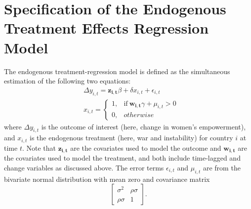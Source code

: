 \section{Specification of the Endogenous Treatment Effects Regression Model}
\vspace*{.2in}
\setlength{\parskip}{-2em}
\doublespacing
\setcounter{table}{0}
\setcounter{figure}{0}


The endogenous treatment-regression model is defined as the simultaneous estimation of the following two equations:
\begin{align}
& \Delta y_{i,t} = \mathbf{z_{i,t}} \beta + \delta x_{i,t} + \epsilon_{i,t} \\
& x_{i,t} = 
 \begin{cases}
 1, & \text{if}\ \mathbf{w_{i,t}} \gamma + \mu_{i,t} >0\\ %
 0, & otherwise
 \end{cases}
\end{align}
where $\Delta y_{i,t}$ is the outcome of interest (here, change in women's empowerment), and $x_{i,t}$ is the endogenous treatment (here, war and instability) for country $i$ at time $t$. Note that $\mathbf{z_{i,t}}$ are the covariates used to model the outcome and $\mathbf{w_{i,t}}$ are the covariates used to model the treatment, and both include time-lagged and change variables as discussed above. The error terms $\epsilon_{i,t}$ and $\mu_{i,t}$ are from the bivariate normal distribution with mean zero and covariance matrix  
\[\begin{bmatrix}
\sigma^2 & \rho \sigma \\
\rho \sigma & 1
\end{bmatrix}.\] \\

